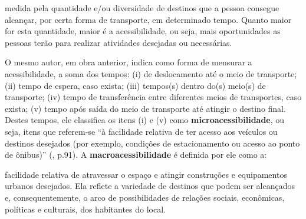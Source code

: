 \begin{citacao}
medida pela quantidade e/ou diversidade de destinos que a pessoa consegue alcançar, por certa forma de transporte, em determinado tempo. Quanto maior for esta quantidade, maior é a acessibilidade, ou seja, mais oportunidades as pessoas terão para realizar atividades desejadas ou necessárias. \cite[p.42]{VASCONCELLOS2012}
\end{citacao}

O mesmo autor, em obra anterior, indica como forma de mensurar a acessibilidade, a soma dos tempos: (i) de deslocamento até o meio de transporte; (ii) tempo de espera, caso exista; (iii) tempos(s) dentro do(s) meio(s) de transporte; (iv) tempo de transferência entre diferentes meios de transportes, caso exista; (v) tempo após saída do meio de transporte até atingir o destino final. Destes tempos, ele classifica os itens (i) e (v) como \textbf{microacessibilidade}, ou seja, itens que referem-se ``à facilidade relativa de ter acesso aos veículos ou destinos desejados (por exemplo, condições de estacionamento ou acesso ao ponto de ônibus)'' (\citeyear{VASCONCELLOS2001}, p.91). A \textbf{macroacessibilidade} é definida por ele como a:

\begin{citacao}
facilidade relativa de atravessar o espaço e atingir construções e equipamentos urbanos desejados. Ela reflete a variedade de destinos que podem ser alcançados e, consequentemente, o arco de possibilidades de relações sociais, econômicas, políticas e culturais, dos habitantes do local. \cite[p.91]{VASCONCELLOS2001}
\end{citacao}

